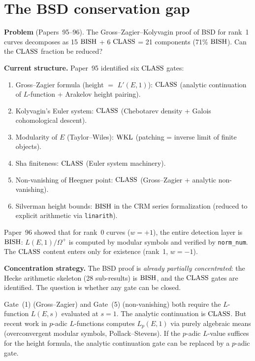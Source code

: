 \documentclass[11pt,a4paper]{article}
\theoremstyle{plain}
\theoremstyle{definition}
\newcommand{\BISH}{\textup{BISH}}
\newcommand{\WKL}{\textup{WKL}}
\newcommand{\CLASS}{\textup{CLASS}}
\begin{document}
\section{The BSD conservation gap}\label{sec:bsd-conservation}

\noindent\textbf{Problem} (Papers~95--96).
The Gross--Zagier--Kolyvagin proof of BSD for rank~1 curves
decomposes as 15 $\BISH$ + 6 $\CLASS$ = 21 components (71\%
$\BISH$).  Can the $\CLASS$ fraction be reduced?

\medskip
\noindent\textbf{Current structure.}
Paper~95 identified six $\CLASS$ gates:
\begin{enumerate}[nosep]
\item Gross--Zagier formula (height $=$ $L'(E,1)$): $\CLASS$
  (analytic continuation of $L$-function + Arakelov height pairing).
\item Kolyvagin's Euler system: $\CLASS$ (Chebotarev density + Galois
  cohomological descent).
\item Modularity of $E$ (Taylor--Wiles): $\WKL$ (patching = inverse
  limit of finite objects).
\item Sha finiteness: $\CLASS$ (Euler system machinery).
\item Non-vanishing of Heegner point: $\CLASS$ (Gross--Zagier + analytic
  non-vanishing).
\item Silverman height bounds: $\BISH$ in the CRM series formalization
  (reduced to explicit arithmetic via \texttt{linarith}).
\end{enumerate}

Paper~96 showed that for rank~0 curves ($w = +1$), the entire detection
layer is $\BISH$: $L(E,1)/\Omega^+$ is computed by modular symbols
and verified by \texttt{norm\_num}.  The $\CLASS$ content enters only
for existence (rank~1, $w = -1$).

\medskip
\noindent\textbf{Concentration strategy.}
The BSD proof is \emph{already partially concentrated}:  the Hecke
arithmetic skeleton (28 sub-results) is $\BISH$, and the $\CLASS$
gates are identified.  The question is whether any gate can be closed.

Gate~(1) (Gross--Zagier) and Gate~(5) (non-vanishing) both require
the $L$-function $L(E, s)$ evaluated at $s = 1$.  The analytic
continuation is $\CLASS$.  But recent work in $p$-adic $L$-functions
computes $L_p(E, 1)$ via purely algebraic means (overconvergent modular
symbols, Pollack--Stevens).  If the $p$-adic $L$-value suffices for
the height formula, the analytic continuation gate can be replaced by
a $p$-adic gate.
\end{document}
